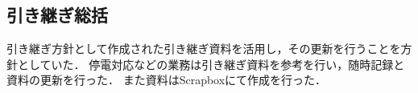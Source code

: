 \subsection*{引き継ぎ総括}


引き継ぎ方針として作成された引き継ぎ資料を活用し，その更新を行うことを方針としていた．
停電対応などの業務は引き継ぎ資料を参考を行い，随時記録と資料の更新を行った．
また資料はScrapboxにて作成を行った．
